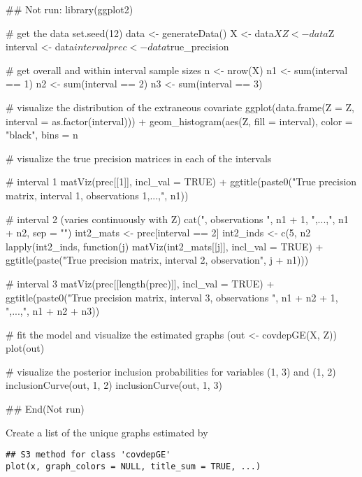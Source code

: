 \documentclass[a4paper]{book}
\begin{document}
\begin{Examples}
\begin{ExampleCode}
## Not run: 
library(ggplot2)

# get the data
set.seed(12)
data <- generateData()
X <- data$X
Z <- data$Z
interval <- data$interval
prec <- data$true_precision

# get overall and within interval sample sizes
n <- nrow(X)
n1 <- sum(interval == 1)
n2 <- sum(interval == 2)
n3 <- sum(interval == 3)

# visualize the distribution of the extraneous covariate
ggplot(data.frame(Z = Z, interval = as.factor(interval))) +
  geom_histogram(aes(Z, fill = interval), color = "black", bins = n %

# visualize the true precision matrices in each of the intervals

# interval 1
matViz(prec[[1]], incl_val = TRUE) +
  ggtitle(paste0("True precision matrix, interval 1, observations 1,...,", n1))

# interval 2 (varies continuously with Z)
cat(", observations ", n1 + 1, ",...,", n1 + n2, sep = "")
int2_mats <- prec[interval == 2]
int2_inds <- c(5, n2 %
lapply(int2_inds, function(j) matViz(int2_mats[[j]], incl_val = TRUE) +
         ggtitle(paste("True precision matrix, interval 2, observation", j + n1)))

# interval 3
matViz(prec[[length(prec)]], incl_val = TRUE) +
  ggtitle(paste0("True precision matrix, interval 3, observations ",
                 n1 + n2 + 1, ",...,", n1 + n2 + n3))

# fit the model and visualize the estimated graphs
(out <- covdepGE(X, Z))
plot(out)

# visualize the posterior inclusion probabilities for variables (1, 3) and (1, 2)
inclusionCurve(out, 1, 2)
inclusionCurve(out, 1, 3)

## End(Not run)
\end{ExampleCode}
\end{Examples}
%
\begin{Description}\relax
Create a list of the unique graphs estimated by 
\end{Description}
%
\begin{Usage}
\begin{verbatim}
## S3 method for class 'covdepGE'
plot(x, graph_colors = NULL, title_sum = TRUE, ...)
\end{verbatim}
\end{Usage}
\end{document}
